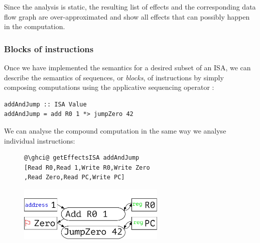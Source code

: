 \noindent
Since the analysis is static, the resulting list of effects and the
corresponding data flow graph are over-approximated and show all effects that
can possibly happen in the computation.


\subsubsection{Blocks of instructions}

Once we have implemented the semantics for a desired subset of an ISA, we can
describe the semantics of sequences, or \emph{blocks}, of instructions by
simply composing  computations using the applicative sequencing operator
\hs{*>}:

\vspace{1mm}
\begin{verbatim}
addAndJump :: ISA Value
addAndJump = add R0 1 *> jumpZero 42
\end{verbatim}
\vspace{1mm}

\noindent
We can analyse the compound computation in the same way we analyse individual
instructions:

\vspace{-3mm}
\begin{figure}[!h]
 \begin{minipage}{0.45\textwidth}
\raggedleft
\begin{verbatim}
@\ghci@ getEffectsISA addAndJump
[Read R0,Read 1,Write R0,Write Zero
,Read Zero,Read PC,Write PC]
\end{verbatim}
 \end{minipage}
 \begin{minipage}{0.45\textwidth}
  \centering
\includegraphics[width=7cm]{./fig/addAndJump.pdf}
 \end{minipage}
\end{figure}

